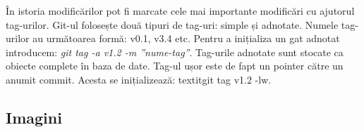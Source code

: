 	În istoria modificărilor pot fi marcate cele mai importante modificări cu ajutorul tag-urilor. Git-ul folosește două tipuri de tag-uri: simple și adnotate. Numele tag-urilor au următoarea formă: v0.1, v3.4 etc. Pentru a inițializa un gat adnotat introducem: \textit{git tag -a v1.2 -m ”nume-tag”}. Tag-urile adnotate sunt stocate ca obiecte complete în baza de date. Tag-ul ușor este de fapt un pointer către un anumit commit. Acesta se inițializează: textit{git tag v1.2 -lw}.
	
	
\subsection{Imagini}



\clearpage